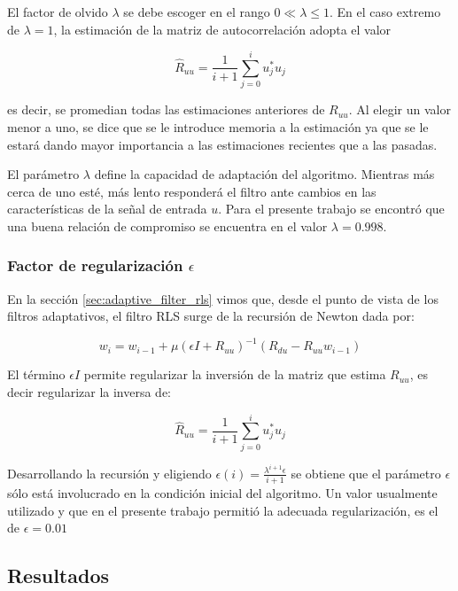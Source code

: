 El factor de olvido $\lambda$ se debe escoger en el rango $0 \ll \lambda \le 1$. En el caso extremo de $\lambda=1$, la estimación de la matriz de autocorrelación adopta el valor

\begin{equation*}
	\hat{R}_{uu} = \frac{1}{i+1} \sum_{j=0}^{i} u_j^* u_j
\end{equation*}

\noindent es decir, se promedian todas las estimaciones anteriores de $R_{uu}$. Al elegir un valor menor a uno, se dice que se le introduce memoria a la estimación ya que se le estará dando mayor importancia a las estimaciones recientes que a las pasadas. 

El parámetro $\lambda$ define la capacidad de adaptación del algoritmo. Mientras más cerca de uno esté, más lento responderá el filtro ante cambios en las características de la señal de entrada $u$. Para el presente trabajo se encontró que una buena relación de compromiso se encuentra en el valor $\lambda=0.998$.

\subsubsection{Factor de regularización $\epsilon$}

En la sección \ref{sec:adaptive_filter_rls} vimos que, desde el punto de vista de los filtros adaptativos, el filtro RLS surge de la recursión de Newton dada por:

\begin{equation}
	w_i = w_{i-1} + \mu (\epsilon I + R_{uu} )^{-1} \left( R_{du} - R_{uu} w_{i-1} \right)
\end{equation}

El término $\epsilon I$ permite regularizar la inversión de la matriz que estima $R_{uu}$, es decir regularizar la inversa de:

\begin{equation*}
	\hat{R}_{uu} = \frac{1}{i+1} \sum_{j=0}^{i} u_j^* u_j
\end{equation*}

Desarrollando la recursión y eligiendo $\epsilon(i) = \frac{\lambda^{i+1} \epsilon }{i+1}$ se obtiene que el parámetro $\epsilon$ sólo está involucrado en la condición inicial del algoritmo. Un valor usualmente utilizado y que en el presente trabajo permitió la adecuada regularización, es el de $\epsilon=0.01$


\subsection{Resultados}

